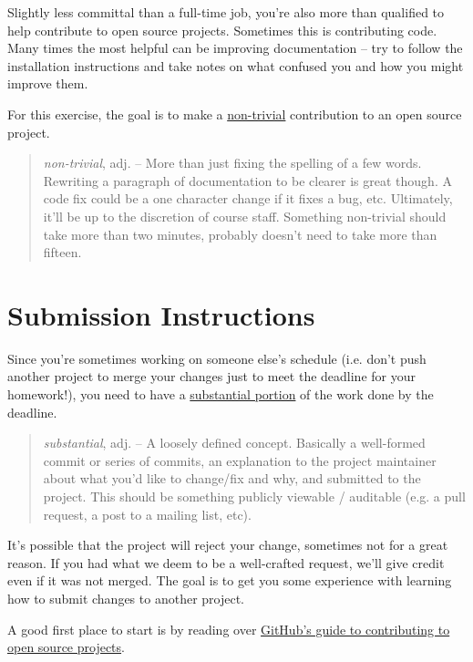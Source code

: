 \documentclass{article}
\begin{document}
Slightly less committal than a full-time job, you're also more than qualified
to help contribute to open source projects. Sometimes this is contributing
code. Many times the most helpful can be improving documentation -- try to
follow the installation instructions and take notes on what confused you and
how you might improve them.

For this exercise, the goal is to make a \ul{non-trivial} contribution to an
open source project.

\begin{quote}
  \emph{non-trivial}, adj. -- More than just fixing the spelling of a few words.
    Rewriting a paragraph of documentation to be clearer is great though. A code
    fix could be a one character change if it fixes a bug, etc. Ultimately,
    it'll be up to the discretion of course staff. Something non-trivial should
    take more than two minutes, probably doesn't need to take more than fifteen.
\end{quote}

\section*{Submission Instructions}

Since you're sometimes working on someone else's schedule (i.e. don't push
another project to merge your changes just to meet the deadline for your
homework!), you need to have a \ul{substantial portion} of the work done by
the deadline.

\begin{quote}
  \emph{substantial}, adj. -- A loosely defined concept. Basically a
  well-formed commit or series of commits, an explanation to the project
  maintainer about what you'd like to change/fix and why, and submitted to the
  project. This should be something publicly viewable / auditable (e.g. a
  pull request, a post to a mailing list, etc).
\end{quote}

It's possible that the project will reject your change, sometimes not for a
great reason. If you had what we deem to be a well-crafted request, we'll give
credit even if it was not merged. The goal is to get you some experience with
learning how to submit changes to another project.

\begin{mdframed}\centering
A good first place to start is by reading over
\href{https://guides.github.com/activities/contributing-to-open-source/#contributing}{GitHub's
  guide to contributing to open source projects}.
\end{mdframed}
\end{document}
